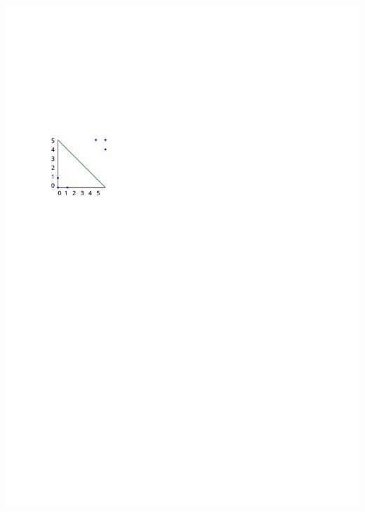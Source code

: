 \documentclass[fleqn]{article}
\begin{document}
\begin{description}
    \includegraphics[scale=1]{min_distance_cluster}


\end{description}
\end{document}
